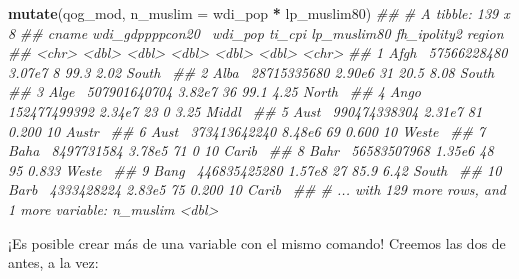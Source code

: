 \documentclass[]{book}
\newenvironment{Shaded}{\begin{snugshade}}{\end{snugshade}}
\newcommand{\CommentTok}[1]{\textcolor[rgb]{0.56,0.35,0.01}{\textit{#1}}}
\newcommand{\DataTypeTok}[1]{\textcolor[rgb]{0.13,0.29,0.53}{#1}}
\newcommand{\KeywordTok}[1]{\textcolor[rgb]{0.13,0.29,0.53}{\textbf{#1}}}
\newcommand{\NormalTok}[1]{#1}
\newcommand{\OperatorTok}[1]{\textcolor[rgb]{0.81,0.36,0.00}{\textbf{#1}}}
\newcommand{\StringTok}[1]{\textcolor[rgb]{0.31,0.60,0.02}{#1}}
\begin{document}
\begin{Shaded}
\begin{Highlighting}[]
\KeywordTok{mutate}\NormalTok{(qog_mod, }\DataTypeTok{n_muslim =}\NormalTok{ wdi_pop }\OperatorTok{*}\StringTok{ }\NormalTok{lp_muslim80)}
\CommentTok{## # A tibble: 139 x 8}
\CommentTok{##    cname wdi_gdppppcon20~ wdi_pop ti_cpi lp_muslim80 fh_ipolity2 region}
\CommentTok{##    <chr>            <dbl>   <dbl>  <dbl>       <dbl>       <dbl> <chr> }
\CommentTok{##  1 Afgh~      57566228480  3.07e7      8      99.3         2.02  South~}
\CommentTok{##  2 Alba~      28715335680  2.90e6     31      20.5         8.08  South~}
\CommentTok{##  3 Alge~     507901640704  3.82e7     36      99.1         4.25  North~}
\CommentTok{##  4 Ango~     152477499392  2.34e7     23       0           3.25  Middl~}
\CommentTok{##  5 Aust~     990474338304  2.31e7     81       0.200      10     Austr~}
\CommentTok{##  6 Aust~     373413642240  8.48e6     69       0.600      10     Weste~}
\CommentTok{##  7 Baha~       8497731584  3.78e5     71       0          10     Carib~}
\CommentTok{##  8 Bahr~      56583507968  1.35e6     48      95           0.833 Weste~}
\CommentTok{##  9 Bang~     446835425280  1.57e8     27      85.9         6.42  South~}
\CommentTok{## 10 Barb~       4333428224  2.83e5     75       0.200      10     Carib~}
\CommentTok{## # ... with 129 more rows, and 1 more variable: n_muslim <dbl>}
\end{Highlighting}
\end{Shaded}

¡Es posible crear más de una variable con el mismo comando! Creemos las
dos de antes, a la vez:
\end{document}
